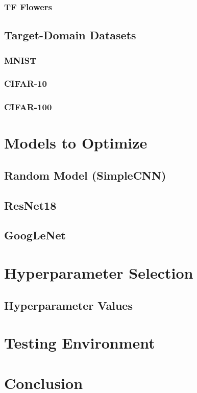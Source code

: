\subsubsection{TF Flowers}

\subsection{Target-Domain Datasets}

\subsubsection{MNIST}

\subsubsection{CIFAR-10}

\subsubsection{CIFAR-100}

\section{Models to Optimize}

\subsection{Random Model (SimpleCNN)}

\subsection{ResNet18}

\subsection{GoogLeNet}

\section{Hyperparameter Selection}

\subsection{Hyperparameter Values}

\section{Testing Environment}

\section{Conclusion}

